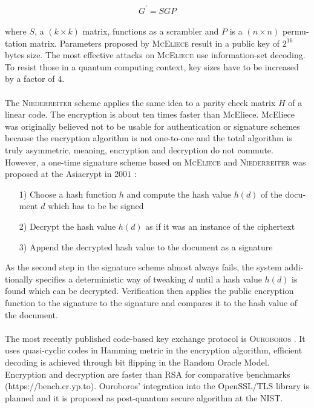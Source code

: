 \documentclass[a4paper,11pt]{article}
\begin{document}
\begin{otherlanguage}{english}
\begin{multicols}{2}
$$ G^\prime = SGP $$
\\
where $S$, a $(k \times k)$ matrix, functions as a scrambler and $P$ is a $(n \times n)$ permutation matrix. Parameters proposed by \textsc{McEliece} \cite{MCE} result in a public key of $2^{16}$ bytes size. The most effective attacks on \textsc{McEliece} use information-set decoding. To resist those in a quantum computing context, key sizes have to be increased by a factor of 4.\\
\\
The \textsc{Niederreiter} scheme \cite{NR} applies the same idea to a parity check matrix $H$ of a linear code. The encryption is about ten times faster than McEliece.  McEliece was originally believed not to be usable for authentication or signature schemes because the encryption algorithm is not one-to-one and the total algorithm is truly asymmetric, meaning, encryption and decryption do not commute. However, a one-time signature scheme based on \textsc{McEliece} and \textsc{Niederreiter} was 
proposed at the Asiacrypt in $2001$ \cite{CFS}: \\

\begin{itemize} [noitemsep, nolistsep]
\item[1)] Choose a hash function $h$  and compute the hash value $h(d)$ of the document $d$ which has to be be signed
\item[2)] Decrypt the hash value $h(d)$ as if it was an instance of the ciphertext
\item[3)] Append the decrypted hash value to the document as a signature
\end{itemize} 

\vspace{0.4cm}
\noindent
As the second step in the signature scheme almost always fails, the system additionally specifies a deterministic way of tweaking $d$ until a hash value $h(d)$ is found which can be decrypted. Verification then applies the public encryption function to the signature to the signature and compares it to the hash value of the document. \\
\\
The most recently published code-based key exchange protocol is \textsc{Ouroboros} \cite{OUR}. It uses quasi-cyclic codes in Hamming metric in the encryption algorithm, efficient decoding is achieved through bit flipping in the Random Oracle Model. Encryption and decryption are faster than RSA for comparative benchmarks (https://bench.cr.yp.to). Ouroboros' integration into the OpenSSL/TLS library is planned and it is proposed as post-quantum secure algorithm at the NIST.


\end{multicols}
\end{otherlanguage}
\end{document}
